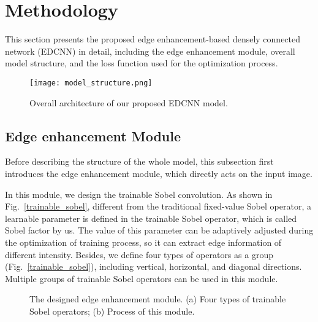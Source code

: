 \documentclass[conference]{IEEEtran}
\begin{document}
        \smallskip

    \section{Methodology}
        This section presents the proposed edge enhancement-based densely connected network (EDCNN) in detail, including the edge enhancement module, overall model structure, and the loss function used for the optimization process.
        
        \begin{figure*}[tp]
            \centering
            \texttt{[image: model\_structure.png]}
            \caption{Overall architecture of our proposed EDCNN model.}
            \label{model_structure}
        \end{figure*}

        \subsection{Edge enhancement Module} \label{methodology_section_A}
            Before describing the structure of the whole model, this subsection first introduces the edge enhancement module, which directly acts on the input image.
            
            In this module, we design the trainable Sobel convolution. 
            As shown in Fig.~\ref{trainable_sobel}, different from the traditional fixed-value Sobel operator\cite{sobel_operator}, a learnable parameter  is defined in the trainable Sobel operator, which is called Sobel factor by us.
            The value of this parameter can be adaptively adjusted during the optimization of training process, so it can extract edge information of different intensity.
            Besides, we define four types of operators as a group (Fig.~\ref{trainable_sobel}), including vertical, horizontal, and diagonal directions. 
            Multiple groups of trainable Sobel operators can be used in this module. 

            \begin{figure}[h]
                \hspace{0.05\linewidth}
                \caption{The designed edge enhancement module. (a) Four types of trainable Sobel operators; (b) Process of this module.}
                \label{trainable_sobel_and_edge_enhancement_module}
            \end{figure}
            
\end{document}
